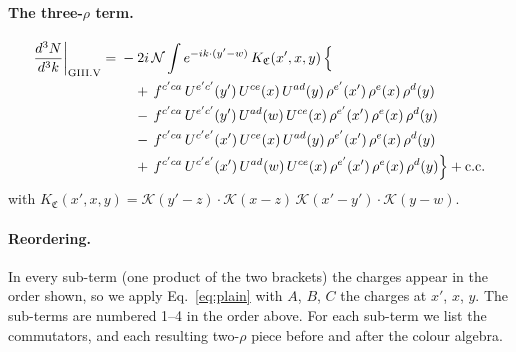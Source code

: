 \documentclass[10pt]{article}
\numberwithin{equation}{section}
\newcommand{\KK}{\mathcal K}
\newcommand{\NN}{\mathcal N}
\begin{document}
\paragraph{The three-$\rho$ term.}
\begin{align}
\frac{d^3N}{d^3k}\bigg|_{\rm GIII.V}={}&-2i\,\NN\int e^{-ik\cdot(y'-w)}\,K_{\mathfrak C}(x',x,y)\,\Big\{\notag\\
&\quad +\,f^{c'ca}\,U^{e'c'}(y')\,U^{ce}(x)\,U^{ad}(y)\,\rho^{e'}(x')\,\rho^{e}(x)\,\rho^{d}(y)\notag\\
&\quad -\,f^{c'ca}\,U^{e'c'}(y')\,U^{ad}(w)\,U^{ce}(x)\,\rho^{e'}(x')\,\rho^{e}(x)\,\rho^{d}(y)\notag\\
&\quad -\,f^{c'ca}\,U^{c'e'}(x')\,U^{ce}(x)\,U^{ad}(y)\,\rho^{e'}(x')\,\rho^{e}(x)\,\rho^{d}(y)\notag\\
&\quad +\,f^{c'ca}\,U^{c'e'}(x')\,U^{ad}(w)\,U^{ce}(x)\,\rho^{e'}(x')\,\rho^{e}(x)\,\rho^{d}(y)\Big\}+{\rm c.c.}\label{eq:in-GIII.V}
\end{align}
with $K_{\mathfrak C}(x',x,y)=\KK(y'-z)\cdot\KK(x-z)\,\KK(x'-y')\cdot\KK(y-w)$.
\paragraph{Reordering.} In every sub-term (one product of the two brackets) the charges appear in the order shown, so we apply Eq.~\eqref{eq:plain} with $A$, $B$, $C$ the charges at $x'$, $x$, $y$. The sub-terms are numbered 1--4 in the order above. For each sub-term we list the commutators, and each resulting two-$\rho$ piece before and after the colour algebra.
\end{document}
